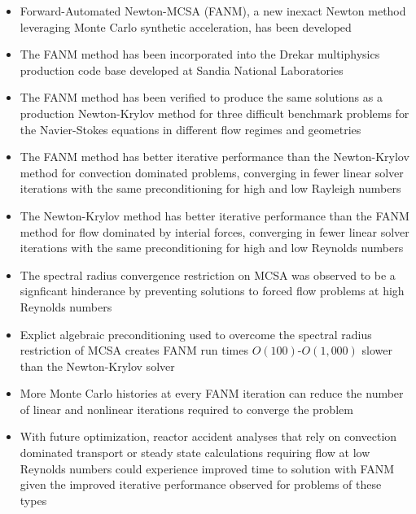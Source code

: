 \begin{itemize}
\item Forward-Automated Newton-MCSA (FANM), a new inexact Newton
  method leveraging Monte Carlo synthetic acceleration, has been
  developed
\item The FANM method has been incorporated into the Drekar
  multiphysics production code base developed at Sandia National
  Laboratories
\item The FANM method has been verified to produce the same solutions
  as a production Newton-Krylov method for three difficult benchmark
  problems for the Navier-Stokes equations in different flow regimes
  and geometries
\item The FANM method has better iterative performance than the
  Newton-Krylov method for convection dominated problems, converging
  in fewer linear solver iterations with the same preconditioning for
  high and low Rayleigh numbers
\item The Newton-Krylov method has better iterative performance than
  the FANM method for flow dominated by interial forces, converging in
  fewer linear solver iterations with the same preconditioning for
  high and low Reynolds numbers
\item The spectral radius convergence restriction on MCSA was observed
  to be a signficant hinderance by preventing solutions to forced flow
  problems at high Reynolds numbers
\item Explict algebraic preconditioning used to overcome the spectral
  radius restriction of MCSA creates FANM run times
  $O(100)$-$O(1,000)$ slower than the Newton-Krylov solver
\item More Monte Carlo histories at every FANM iteration can reduce
  the number of linear and nonlinear iterations required to converge
  the problem
\item With future optimization, reactor accident analyses that rely on
  convection dominated transport or steady state calculations
  requiring flow at low Reynolds numbers could experience improved
  time to solution with FANM given the improved iterative performance
  observed for problems of these types
\end{itemize}
